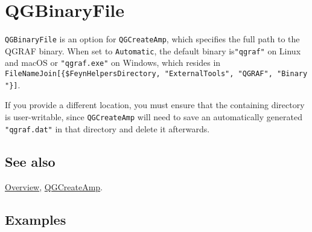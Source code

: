 \documentclass[../FeynHelpersManual.tex]{subfiles}
\begin{document}
\hypertarget{qgbinaryfile}{
\section{QGBinaryFile}\label{qgbinaryfile}}

\texttt{QGBinaryFile} is an option for \texttt{QGCreateAmp}, which
specifies the full path to the QGRAF binary. When set to
\texttt{Automatic}, the default binary is\texttt{"qgraf"} on Linux and
macOS or \texttt{"qgraf.exe"} on Windows, which resides in
\texttt{FileNameJoin[\allowbreak{}\{\allowbreak{}\$FeynHelpersDirectory,\ \allowbreak{}"ExternalTools",\ \allowbreak{}"QGRAF",\ \allowbreak{}"Binary"\}]}.

If you provide a different location, you must ensure that the containing
directory is user-writable, since \texttt{QGCreateAmp} will need to save
an automatically generated \texttt{"qgraf.dat"} in that directory and
delete it afterwards.

\subsection{See also}

\hyperlink{toc}{Overview}, \hyperlink{qgcreateamp}{QGCreateAmp}.

\subsection{Examples}
\end{document}
